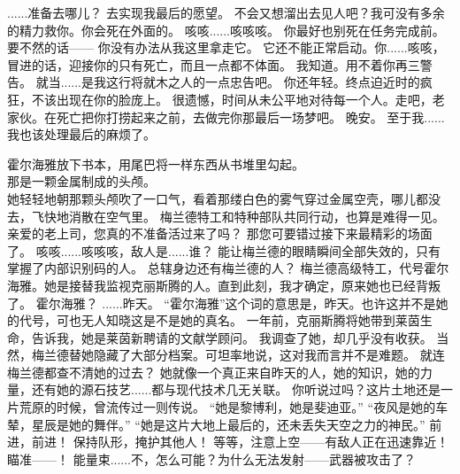 \documentclass[openany]{book}
\begin{document}
\begin{dialogue}
     ......准备去哪儿？
     去实现我最后的愿望。
     不会又想溜出去见人吧？我可没有多余的精力救你。你会死在外面的。
     咳咳......咳咳咳。
     你最好也别死在任务完成前。
     要不然的话——
     你没有办法从我这里拿走它。
     它还不能正常启动。你......咳咳，冒进的话，迎接你的只有死亡，而且一点都不体面。
     我知道。用不着你再三警告。
     就当......是我这行将就木之人的一点忠告吧。
     你还年轻。终点迫近时的疯狂，不该出现在你的脸庞上。
     很遗憾，时间从未公平地对待每一个人。走吧，老家伙。在死亡把你打捞起来之前，去做完你那最后一场梦吧。
     晚安。
     至于我......我也该处理最后的麻烦了。\par
    霍尔海雅放下书本，用尾巴将一样东西从书堆里勾起。\\
    那是一颗金属制成的头颅。\\
    她轻轻地朝那颗头颅吹了一口气，看着那缕白色的雾气穿过金属空壳，哪儿都没去，飞快地消散在空气里。
     梅兰德特工和特种部队共同行动，也算是难得一见。
     亲爱的老上司，您真的不准备活过来了吗？
     那您可要错过接下来最精彩的场面了。
     咳咳......咳咳咳，敌人是......谁？
     能让梅兰德的眼睛瞬间全部失效的，只有掌握了内部识别码的人。
     总辖身边还有梅兰德的人？
     梅兰德高级特工，代号霍尔海雅。她是接替我监视克丽斯腾的人。直到此刻，我才确定，原来她也已经背叛了。
     霍尔海雅？
     ......昨天。
     “霍尔海雅”这个词的意思是，昨天。也许这并不是她的代号，可也无人知晓这是不是她的真名。
     一年前，克丽斯腾将她带到莱茵生命，告诉我，她是莱茵新聘请的文献学顾问。
     我调查了她，却几乎没有收获。
     当然，梅兰德替她隐藏了大部分档案。可坦率地说，这对我而言并不是难题。
     就连梅兰德都查不清她的过去？
     她就像一个真正来自昨天的人，她的知识，她的力量，还有她的源石技艺......都与现代技术几无关联。
     你听说过吗？这片土地还是一片荒原的时候，曾流传过一则传说。
     “她是黎博利，她是斐迪亚。”
     “夜风是她的车辇，星辰是她的舞伴。”
     “她是这片大地上最后的，还未丢失天空之力的神民。”
     前进，前进！
     保持队形，掩护其他人！
     等等，注意上空——有敌人正在迅速靠近！
     瞄准——！
     能量束......不，怎么可能？为什么无法发射——武器被攻击了？

\end{dialogue}
\end{document}
